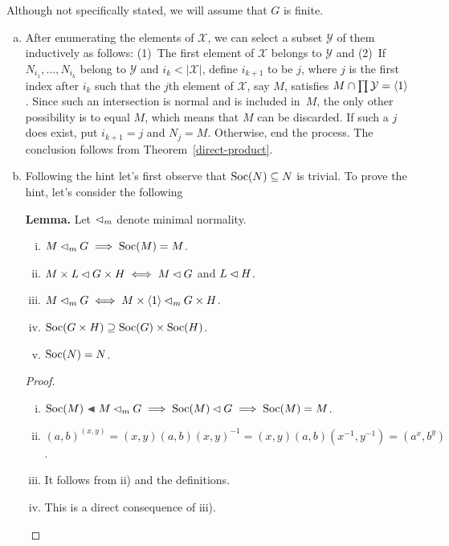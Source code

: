 \begin{solution} Although not specifically stated, we will assume that $G$ is finite.

\begin{enumerate}[a),font=\upshape]
    \item After enumerating the elements of $\mathcal X$, we can select a subset $\mathcal Y$ of them inductively as follows: (1)~The first element of $\mathcal X$ belongs to $\mathcal Y$ and (2)~If $N_{i_1},\dots,N_{i_k}$ belong to $\mathcal Y$ and $i_k<|\mathcal X|$, define $i_{k+1}$ to be $j$, where $j$ is the first index after $i_k$ such that the $j$th element of $\mathcal X$, say $M$, satisfies $M\cap\prod{\mathcal Y}=\langle1\rangle$. Since such an intersection is normal and is included in~$M$, the only other possibility is to equal $M$, which means that $M$ can be discarded. If such a $j$ does exist, put $i_{k+1}=j$ and $N_j=M$. Otherwise, end the process. The conclusion follows from Theorem~\ref{direct-product}.

    \item Following the hint let's first observe that ${\rm Soc}(N)\subseteq N$ is trivial. To prove the hint, let's consider the following

    \textbf{Lemma.} Let $\lhd_m$ denote minimal normality. 
    \begin{enumerate}[i),font=\upshape]
        \item $M\lhd_mG\implies{\rm Soc}(M)=M$.
        \item $M\times L\lhd G\times H\iff M\lhd G$ and $L\lhd H$.
        \item $M\lhd_mG\iff M\times\langle1\rangle\lhd_mG\times H$.
        \item ${\rm Soc}(G\times H)\supseteq{\rm Soc}(G)\times{\rm Soc}(H)$.
        \item ${\rm Soc}(N)=N$.
    \end{enumerate}

    \begin{proof}\  
    \begin{enumerate}[i),font=\upshape]
        \item $\Soc(M)\ch M\normal_mG\implies\Soc(M)\normal G\implies\Soc(M)=M$.
        \item $(a,b)^{(x,y)} = (x,y)(a,b)(x,y)^{-1} = (x,y)(a,b)(x^{-1},y^{-1})=(a^x,b^y)$.
        \item It follows from ii) and the definitions.
        \item This is a direct consequence of iii).


\end{enumerate}
\end{proof}
\end{enumerate}
\end{solution}
